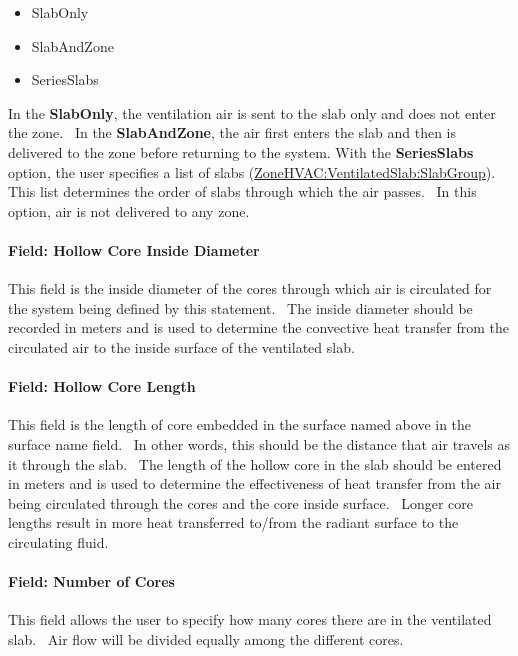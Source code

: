 \begin{itemize}
\item
  SlabOnly
\item
  SlabAndZone
\item
  SeriesSlabs
\end{itemize}

In the \textbf{SlabOnly}, the ventilation air is sent to the slab only and does not enter the zone.~ In the \textbf{SlabAndZone}, the air first enters the slab and then is delivered to the zone before returning to the system. With the \textbf{SeriesSlabs} option, the user specifies a list of slabs (\hyperref[zonehvacventilatedslabslabgroup]{ZoneHVAC:VentilatedSlab:SlabGroup}). This list determines the order of slabs through which the air passes.~ In this option, air is not delivered to any zone.

\paragraph{Field: Hollow Core Inside Diameter}\label{field-hollow-core-inside-diameter}

This field is the inside diameter of the cores through which air is circulated for the system being defined by this statement.~ The inside diameter should be recorded in meters and is used to determine the convective heat transfer from the circulated air to the inside surface of the ventilated slab.

\paragraph{Field: Hollow Core Length}\label{field-hollow-core-length}

This field is the length of core embedded in the surface named above in the surface name field.~ In other words, this should be the distance that air travels as it through the slab.~ The length of the hollow core in the slab should be entered in meters and is used to determine the effectiveness of heat transfer from the air being circulated through the cores and the core inside surface.~ Longer core lengths result in more heat transferred to/from the radiant surface to the circulating fluid.

\paragraph{Field: Number of Cores}\label{field-number-of-cores}

This field allows the user to specify how many cores there are in the ventilated slab.~ Air flow will be divided equally among the different cores.

